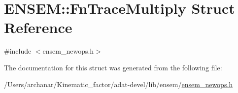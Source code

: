 \hypertarget{structENSEM_1_1FnTraceMultiply}{}\section{E\+N\+S\+EM\+:\+:Fn\+Trace\+Multiply Struct Reference}
\label{structENSEM_1_1FnTraceMultiply}


{\ttfamily \#include $<$ensem\+\_\+newops.\+h$>$}



The documentation for this struct was generated from the following file\+:\begin{DoxyCompactItemize}
\item 
/\+Users/archanar/\+Kinematic\+\_\+factor/adat-\/devel/lib/ensem/\mbox{\hyperlink{adat-devel_2lib_2ensem_2ensem__newops_8h}{ensem\+\_\+newops.\+h}}\end{DoxyCompactItemize}
